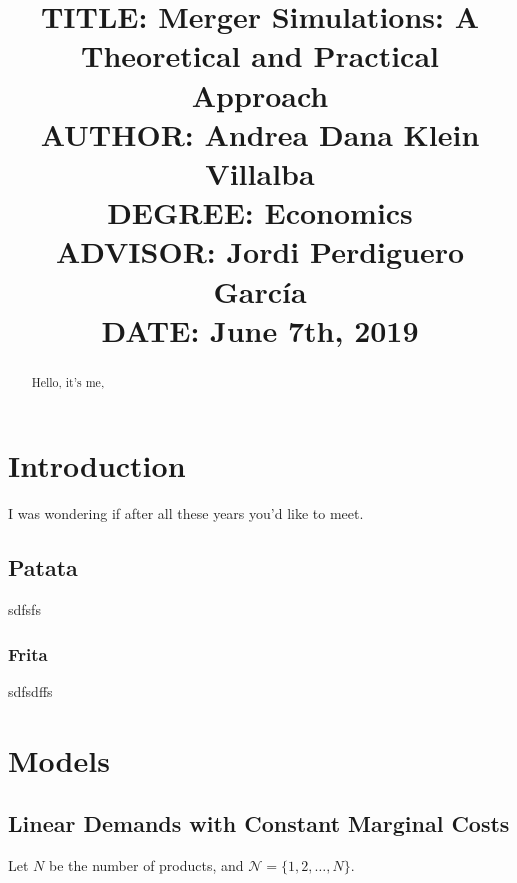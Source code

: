 \documentclass[12pt]{article}
\begin{document}

\title{{\large TITLE: Merger Simulations: A Theoretical and Practical Approach\\
AUTHOR: Andrea Dana Klein Villalba\\
DEGREE: Economics\\
ADVISOR: Jordi Perdiguero Garc\'ia\\
DATE: June 7th, 2019\\}}
\date{}

\clearpage\maketitle
\thispagestyle{empty}
\newpage

\begin{abstract}
Hello, it's me,
\end{abstract}
\newpage

 \tableofcontents
 \newpage

\section{Introduction}
I was wondering if after all these years you'd like to meet.

\subsection{Patata}
sdfsfs

\subsubsection{Frita}
sdfsdffs

\section{Models}


\subsection{Linear Demands with Constant Marginal Costs}
Let $N$ be the number of products, and $\mathcal{N} = \{1, 2, \dots, N\}$.
\end{document}
